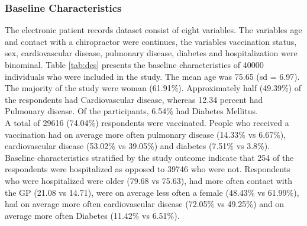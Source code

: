 \documentclass[
]{article}
\begin{document}
\hypertarget{baseline-characteristics}{%
\subsubsection{Baseline Characteristics}\label{baseline-characteristics}}

The electronic patient records dataset consist of eight variables. The variables age and contact with a chiropractor were continues, the variables vaccination status, sex, cardiovascular disease, pulmonary disease, diabetes and hospitalization were binominal. Table \ref{tab:des} presents the baseline characteristics of 40000 individuals who were included in the study. The mean age was 75.65 (sd = 6.97). The majority of the study were woman (61.91\%). Approximately half (49.39\%) of the respondents had Cardiovascular disease, whereas 12.34 percent had Pulmonary disease. Of the participants, 6.54\% had Diabetes Mellitus.\\
\hspace*{0.333em}\hspace*{0.333em}A total of 29616 (74.04\%) respondents were vaccinated. People who received a vaccination had on average more often pulmonary disease (14.33\% vs 6.67\%), cardiovascular disease (53.02\% vs 39.05\%) and diabetes (7.51\% vs 3.8\%).\\
\hspace*{0.333em}\hspace*{0.333em}Baseline characteristics stratified by the study outcome indicate that 254 of the respondents were hospitalized as opposed to 39746 who were not. Respondents who were hospitalized were older (79.68 vs 75.63), had more often contact with the GP (21.08 vs 14.71), were on average less often a female (48.43\% vs 61.99\%), had on average more often cardiovascular disease (72.05\% vs 49.25\%) and on average more often Diabetes (11.42\% vs 6.51\%).
\end{document}
